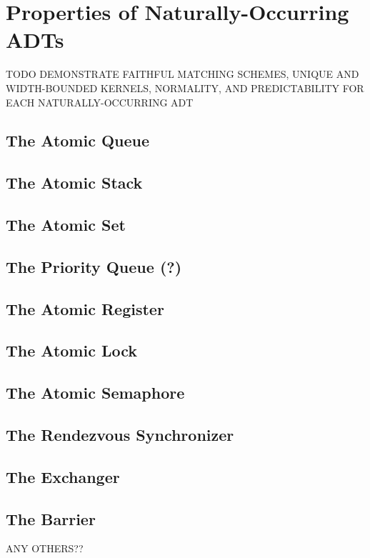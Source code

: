 \section{Properties of Naturally-Occurring ADTs}
\label{sec:nature}

TODO DEMONSTRATE FAITHFUL MATCHING SCHEMES, UNIQUE AND WIDTH-BOUNDED KERNELS,
NORMALITY, AND PREDICTABILITY FOR EACH NATURALLY-OCCURRING ADT

\subsection{The Atomic Queue}

\subsection{The Atomic Stack}

\subsection{The Atomic Set}

\subsection{The Priority Queue (?)}

\subsection{The Atomic Register}

\subsection{The Atomic Lock}

\subsection{The Atomic Semaphore}

\subsection{The Rendezvous Synchronizer}

\subsection{The Exchanger}

\subsection{The Barrier}

ANY OTHERS??
